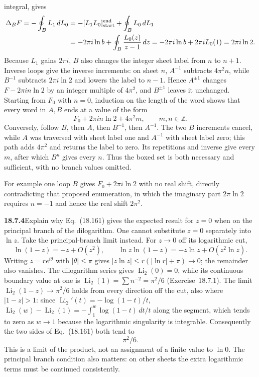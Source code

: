 integral, gives
\begin{align*}
\Delta_B F=-\oint_B L_1\,dL_0
 &=-[L_1L_0]_{\rm start}^{\rm end}+\oint_B L_0\,dL_1\\
 &=-2\pi i\ln b+\oint_B\frac{L_0(z)}{z-1}\,dz
  =-2\pi i\ln b+2\pi i L_0(1)
  =2\pi i\ln2.
\end{align*}
Because $L_1$ gains $2\pi i$, $B$ also changes the integer
sheet label from $n$ to $n+1$.  Inverse loops give the inverse
increments: on sheet $n$, $A^{-1}$ subtracts $4\pi^2n$, while
$B^{-1}$ subtracts $2\pi i\ln2$ and lowers the label to $n-1$.
Hence $A^{\pm1}$ changes $F-2\pi in\ln2$ by an integer multiple of
$4\pi^2$, and $B^{\pm1}$ leaves it unchanged.  Starting from $F_0$
with $n=0$, induction on the length of the word shows that every
word in $A,B$ ends at a value of the form
\[
\boxed{F_0+2\pi i n\ln2+4\pi^2m,\qquad m,n\in\mathbb Z}.
\]
Conversely, follow $B$, then $A$, then $B^{-1}$, then $A^{-1}$.
The two $B$ increments cancel, while $A$ was traversed with
sheet label one and $A^{-1}$ with sheet label zero; this path adds
$4\pi^2$ and returns the label
to zero.  Its repetitions and inverse give every $m$, after
which $B^n$ gives every $n$.  Thus the boxed set is both
necessary and sufficient, with no branch values omitted.

  For example one loop $B$ gives
$F_0+2\pi i\ln2$ with no real shift, directly contradicting
that proposed enumeration, in which the imaginary part $2\pi\ln2$
requires $n=-1$ and hence the real shift $2\pi^2$.

\par\bigskip
\noindent\textbf{18.7.4}\quad Explain why Eq.~(18.161) gives the
expected result for $z=0$ when on the principal branch of the
dilogarithm.
\solution
One cannot substitute $z=0$ separately into $\ln z$.
Take the principal-branch limit instead.  For $z\to0$ off its
logarithmic cut,
\[
\ln(1-z)=-z+O(z^2),\qquad
\ln z\ln(1-z)=-z\ln z+O(z^2\ln z).
\]
Writing $z=re^{i\theta}$ with $|\theta|\le\pi$ gives
$|z\ln z|\le r(|\ln r|+\pi)\to0$; the remainder also
vanishes.  The dilogarithm series gives
$\operatorname{Li}_2(0)=0$, while its continuous boundary value
at one is $\operatorname{Li}_2(1)=\sum n^{-2}=\pi^2/6$
(Exercise~18.7.1).  The limit $\operatorname{Li}_2(1-z)\to\pi^2/6$
holds from every direction off the cut, also where $|1-z|>1$:
since $\operatorname{Li}_2'(t)=-\log(1-t)/t$,
$\operatorname{Li}_2(w)-\operatorname{Li}_2(1)
=-\int_1^w\log(1-t)\,dt/t$ along the segment, which tends to zero
as $w\to1$ because the logarithmic singularity is integrable.
Consequently the two sides of Eq.~(18.161) both tend to
\[
\boxed{\pi^2/6}.
\]
This is a limit of the product, not an assignment of a finite
value to $\ln0$.  The principal branch condition also matters:
on other sheets the extra logarithmic terms must be continued
consistently.


